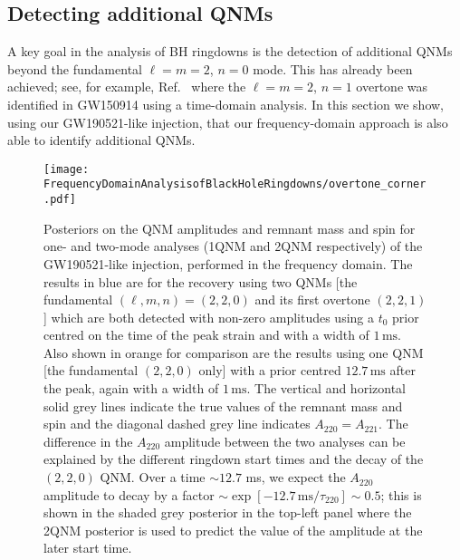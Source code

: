 \subsection{Detecting additional QNMs}\label{subsec:overtones}

A key goal in the analysis of BH ringdowns is the detection of additional QNMs beyond the fundamental $\ell=m=2$, $n=0$ mode.
This has already been achieved; see, for example, Ref.~\cite{Isi:2019aib} where the $\ell=m=2$, $n=1$ overtone was identified in GW150914 using a time-domain analysis.
In this section we show, using our GW190521-like injection, that our frequency-domain approach is also able to identify additional QNMs.

\begin{figure}
    \centering
    \texttt{[image: FrequencyDomainAnalysisofBlackHoleRingdowns/overtone\_corner.pdf]}
    \caption[Posteriors on the QNM amplitudes and remnant mass and spin for one- and two-mode analyses of a GW190521-like injection]{ 
    Posteriors on the QNM amplitudes and remnant mass and spin for one- and two-mode analyses (1QNM and 2QNM respectively) of the GW190521-like injection, performed in the frequency domain.
    The results in blue are for the recovery using two QNMs [the fundamental $(\ell,m,n)=(2,2,0)$ and its first overtone $(2,2,1)$] which are both detected with non-zero amplitudes using a $t_0$ prior centred on the time of the peak strain and with a width of $1\,\mathrm{ms}$.
    Also shown in orange for comparison are the results using one QNM [the fundamental $(2,2,0)$ only] with a prior centred $12.7\,\mathrm{ms}$ after the peak, again with a width of $1\,\mathrm{ms}$.
    The vertical and horizontal solid grey lines indicate the true values of the remnant mass and spin and the diagonal dashed grey line indicates $A_{220}=A_{221}$.
    The difference in the $A_{220}$ amplitude between the two analyses can be explained by the different ringdown start times and the decay of the $(2,2,0)$ QNM.
    Over a time $\sim 12.7$ ms, we expect the $A_{220}$ amplitude to decay by a factor $\sim \exp[-12.7\,\mathrm{ms}/\tau_{220}] \sim 0.5$; this is shown in the shaded grey posterior in the top-left panel where the 2QNM posterior is used to predict the value of the amplitude at the later start time.
    }
    \label{fig:overtone_corner}
\end{figure}

